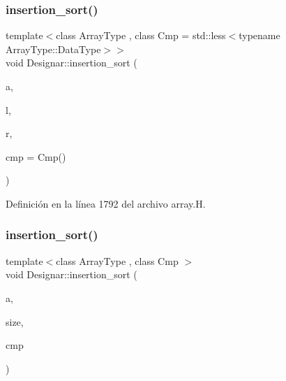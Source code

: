 \subsubsection{\texorpdfstring{insertion\+\_\+sort()}{insertion\_sort()}\hspace{0.1cm}{\footnotesize\ttfamily [2/6]}}
{\footnotesize\ttfamily template$<$class Array\+Type , class Cmp  = std\+::less$<$typename Array\+Type\+::\+Data\+Type$>$$>$ \\
void Designar\+::insertion\+\_\+sort (\begin{DoxyParamCaption}\item[{Array\+Type \&}]{a,  }\item[{\hyperlink{namespace_designar_a9d113d66a39e82b73727c72cd3a52f73}{lint\+\_\+t}}]{l,  }\item[{\hyperlink{namespace_designar_a9d113d66a39e82b73727c72cd3a52f73}{lint\+\_\+t}}]{r,  }\item[{Cmp \&\&}]{cmp = {\ttfamily Cmp()} }\end{DoxyParamCaption})\hspace{0.3cm}{\ttfamily [inline]}}



Definición en la línea 1792 del archivo array.\+H.

\mbox{\label{namespace_designar_a54b704ec22eb8fe7136b1bda64daf3a7}} 
\subsubsection{\texorpdfstring{insertion\+\_\+sort()}{insertion\_sort()}\hspace{0.1cm}{\footnotesize\ttfamily [3/6]}}
{\footnotesize\ttfamily template$<$class Array\+Type , class Cmp $>$ \\
void Designar\+::insertion\+\_\+sort (\begin{DoxyParamCaption}\item[{Array\+Type \&}]{a,  }\item[{\hyperlink{namespace_designar_a9d113d66a39e82b73727c72cd3a52f73}{lint\+\_\+t}}]{size,  }\item[{Cmp \&}]{cmp }\end{DoxyParamCaption})\hspace{0.3cm}{\ttfamily [inline]}}



